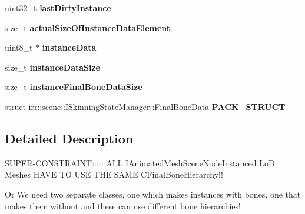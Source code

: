 \begin{DoxyCompactItemize}
\item 
uint32\+\_\+t {\bfseries last\+Dirty\+Instance}\hypertarget{classirr_1_1scene_1_1ISkinningStateManager_a036112bafc63f5664881745f9a7440d4}{}\label{classirr_1_1scene_1_1ISkinningStateManager_a036112bafc63f5664881745f9a7440d4}

\item 
size\+\_\+t {\bfseries actual\+Size\+Of\+Instance\+Data\+Element}\hypertarget{classirr_1_1scene_1_1ISkinningStateManager_aa212691d78753ef1bce90473ed02d00d}{}\label{classirr_1_1scene_1_1ISkinningStateManager_aa212691d78753ef1bce90473ed02d00d}

\item 
uint8\+\_\+t $\ast$ {\bfseries instance\+Data}\hypertarget{classirr_1_1scene_1_1ISkinningStateManager_aaa85cf8babf1cc22d674ee45bd35a450}{}\label{classirr_1_1scene_1_1ISkinningStateManager_aaa85cf8babf1cc22d674ee45bd35a450}

\item 
size\+\_\+t {\bfseries instance\+Data\+Size}\hypertarget{classirr_1_1scene_1_1ISkinningStateManager_aad3c6749d288588d9ab499430d9ef77b}{}\label{classirr_1_1scene_1_1ISkinningStateManager_aad3c6749d288588d9ab499430d9ef77b}

\item 
size\+\_\+t {\bfseries instance\+Final\+Bone\+Data\+Size}\hypertarget{classirr_1_1scene_1_1ISkinningStateManager_ae832866f6912bc8a272d39fa3b676686}{}\label{classirr_1_1scene_1_1ISkinningStateManager_ae832866f6912bc8a272d39fa3b676686}

\item 
struct \hyperlink{structirr_1_1scene_1_1ISkinningStateManager_1_1FinalBoneData}{irr\+::scene\+::\+I\+Skinning\+State\+Manager\+::\+Final\+Bone\+Data} {\bfseries P\+A\+C\+K\+\_\+\+S\+T\+R\+U\+CT}\hypertarget{classirr_1_1scene_1_1ISkinningStateManager_acc1da60b06dbfb41baa3a3eb01d63a5d}{}\label{classirr_1_1scene_1_1ISkinningStateManager_acc1da60b06dbfb41baa3a3eb01d63a5d}

\end{DoxyCompactItemize}


\subsection{Detailed Description}
S\+U\+P\+E\+R-\/\+C\+O\+N\+S\+T\+R\+A\+I\+NT\+:\+:\+:\+:\+: A\+LL I\+Animated\+Mesh\+Scene\+Node\+Instanced LoD Meshes H\+A\+VE TO U\+SE T\+HE S\+A\+ME C\+Final\+Bone\+Hierarchy!! 

Or We need two separate classes, one which makes instances with bones, one that makes them without and these can use different bone hierarchies! 


